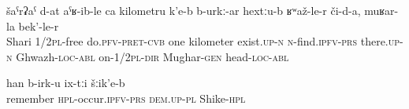 %
\begin{exe}
	\ex	\label{ex:They sent us to Shari it is probably one kilometer}
	\gll	šaˁrʡaˁ	d-at	aˁʁ-ib-le	ca	kilometru	k'e-b	b-urkː-ar	hextːu-b		ʁʷaž-le-r	či-d-a,	muʁar-la	bek'-le-r   \\
		Shari	1/2\textsc{pl}-free	do.\textsc{pfv-pret-cvb}		one	kilometer	exist.\textsc{up-n}	\textsc{n}-find.\textsc{ipfv-prs}	there.\textsc{up-n}	Ghwazh-\textsc{loc-abl}	on-1/2\textsc{pl-dir} Mughar-\textsc{gen}	head-\textsc{loc-abl}\\
	\glt	{}

	\ex	\label{ex:As I remember they were in Shike}
	\gll	han b-irk-u	ix-tːi	šːik'e-b  \\
		remember \textsc{hpl}-occur.\textsc{ipfv-prs}	\textsc{dem.up}-\textsc{pl}	Shike-\textsc{hpl}\\
	\glt	{}
\end{exe}
